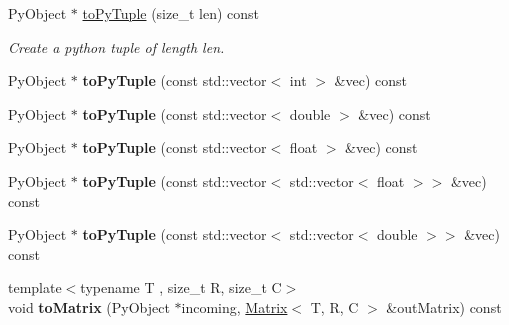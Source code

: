 \begin{Indent}
\begin{DoxyCompactItemize}
\mbox{\label{classrev_1_1_python_a_p_i_ad5fc2be20494d42e234a4bfba2f60a88}} 
Py\+Object $\ast$ \mbox{\hyperlink{classrev_1_1_python_a_p_i_ad5fc2be20494d42e234a4bfba2f60a88}{to\+Py\+Tuple}} (size\+\_\+t len) const
\begin{DoxyCompactList}\small\item\em Create a python tuple of length len. \end{DoxyCompactList}\item 
\mbox{\label{classrev_1_1_python_a_p_i_acc2944d149310a353b49fc4b5ba03713}} 
Py\+Object $\ast$ {\bfseries to\+Py\+Tuple} (const std\+::vector$<$ int $>$ \&vec) const
\item 
\mbox{\label{classrev_1_1_python_a_p_i_a97d4d8fdaba8f8c2935044d6785192f7}} 
Py\+Object $\ast$ {\bfseries to\+Py\+Tuple} (const std\+::vector$<$ double $>$ \&vec) const
\item 
\mbox{\label{classrev_1_1_python_a_p_i_a5b46492a98d46b24acccfce45874c754}} 
Py\+Object $\ast$ {\bfseries to\+Py\+Tuple} (const std\+::vector$<$ float $>$ \&vec) const
\item 
\mbox{\label{classrev_1_1_python_a_p_i_a1258d37754db827a8b4dbf166bdde7e8}} 
Py\+Object $\ast$ {\bfseries to\+Py\+Tuple} (const std\+::vector$<$ std\+::vector$<$ float $>$$>$ \&vec) const
\item 
\mbox{\label{classrev_1_1_python_a_p_i_aa220eaf44dcc2dc18c6e2141d4ba528f}} 
Py\+Object $\ast$ {\bfseries to\+Py\+Tuple} (const std\+::vector$<$ std\+::vector$<$ double $>$$>$ \&vec) const
\item 
\mbox{\label{classrev_1_1_python_a_p_i_aba9fa2428e9da837e24913dd01fcea33}} 
{\footnotesize template$<$typename T , size\+\_\+t R, size\+\_\+t C$>$ }\\void {\bfseries to\+Matrix} (Py\+Object $\ast$incoming, \mbox{\hyperlink{classrev_1_1_matrix}{Matrix}}$<$ T, R, C $>$ \&out\+Matrix) const
\item 
\mbox{\label{classrev_1_1_python_a_p_i_abe3cecdfd0693a0263efd4464caa668f}} 

\end{DoxyCompactItemize}
\end{Indent}
